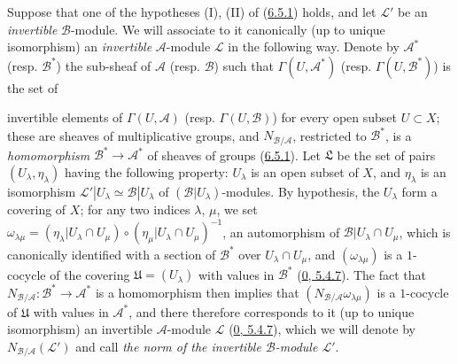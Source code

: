 \begin{env}[6.5.2]
\label{II.6.5.2}
Suppose that one of the hypotheses (I), (II) of
(\hyperref[II.6.5.1]{6.5.1}) holds, and let $\mathcal{L}'$ be an
\emph{invertible} $\mathcal{B}$-module. We will associate to it canonically
(up to unique isomorphism) an \emph{invertible} $\mathcal{A}$-module
$\mathcal{L}$ in the following way. Denote by $\mathcal{A}^*$ (resp.
$\mathcal{B}^*$) the sub-sheaf of $\mathcal{A}$ (resp. $\mathcal{B}$) such
that $\Gamma(U,\mathcal{A}^*)$ (resp. $\Gamma(U,\mathcal{B}^*)$) is the set
of


invertible elements of $\Gamma(U,\mathcal{A})$ (resp.
$\Gamma(U,\mathcal{B})$) for every open subset $U\subset X$; these are
sheaves of multiplicative groups, and $N_{\mathcal{B}/\mathcal{A}}$,
restricted to $\mathcal{B}^*$, is a \emph{homomorphism}
$\mathcal{B}^*\to\mathcal{A}^*$ of sheaves of groups
(\hyperref[II.6.5.1]{6.5.1}). Let $\mathfrak{L}$ be the set of pairs
$(U_\lambda,\eta_\lambda)$ having the following property: $U_\lambda$ is an
open subset of $X$, and $\eta_\lambda$ is an isomorphism
$\mathcal{L}'|U_\lambda\simeq\mathcal{B}|U_\lambda$ of
$(\mathcal{B}|U_\lambda)$-modules. By hypothesis, the $U_\lambda$ form a
covering of $X$; for any two indices $\lambda$, $\mu$, we set
$\omega_{\lambda\mu}=(\eta_\lambda|U_\lambda\cap U_\mu)
\circ(\eta_\mu|U_\lambda\cap U_\mu)^{-1}$, an automorphism of
$\mathcal{B}|U_\lambda\cap U_\mu$, which is canonically identified with a
section of $\mathcal{B}^*$ over $U_\lambda\cap U_\mu$, and
$(\omega_{\lambda\mu})$ is a $1$-cocycle of the covering
$\mathfrak{U}=(U_\lambda)$ with values in $\mathcal{B}^*$
(\hyperref[0.5.4.7]{0, 5.4.7}). The fact that
$N_{\mathcal{B}/\mathcal{A}}:\mathcal{B}^*\to\mathcal{A}^*$ is a
homomorphism then implies that
$(N_{\mathcal{B}/\mathcal{A}}\omega_{\lambda\mu})$ is a $1$-cocycle of
$\mathfrak{U}$ with values in $\mathcal{A}^*$, and there therefore
corresponds to it (up to unique isomorphism) an invertible
$\mathcal{A}$-module $\mathcal{L}$ (\hyperref[0.5.4.7]{0, 5.4.7}), which
we will denote by $N_{\mathcal{B}/\mathcal{A}}(\mathcal{L}')$ and call
\emph{the norm of the invertible $\mathcal{B}$-module $\mathcal{L}'$}.


\end{env}
